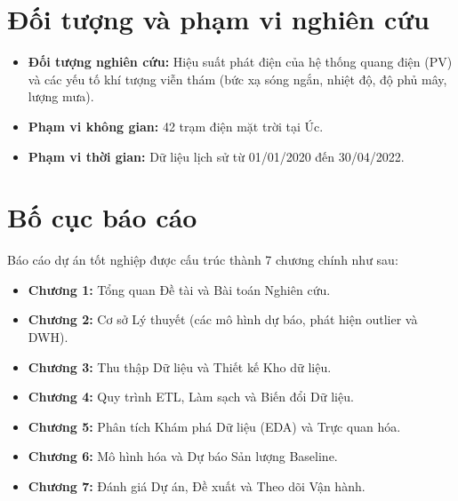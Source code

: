 \documentclass[12pt, a4paper]{report}
\begin{document}
\section{Đối tượng và phạm vi nghiên cứu}
\label{sec:phamvi}

\begin{itemize}[noitemsep]
    \item \textbf{Đối tượng nghiên cứu:} Hiệu suất phát điện của hệ thống quang điện (PV) và các yếu tố khí tượng viễn thám (bức xạ sóng ngắn, nhiệt độ, độ phủ mây, lượng mưa).
    \item \textbf{Phạm vi không gian:} 42 trạm điện mặt trời tại Úc.
    \item \textbf{Phạm vi thời gian:} Dữ liệu lịch sử từ 01/01/2020 đến 30/04/2022.
\end{itemize}

\section{Bố cục báo cáo}
\label{sec:bocuc}

Báo cáo dự án tốt nghiệp được cấu trúc thành 7 chương chính như sau:
\begin{itemize}[noitemsep]
    \item \textbf{Chương 1:} Tổng quan Đề tài và Bài toán Nghiên cứu.
    \item \textbf{Chương 2:} Cơ sở Lý thuyết (các mô hình dự báo, phát hiện outlier và DWH).
    \item \textbf{Chương 3:} Thu thập Dữ liệu và Thiết kế Kho dữ liệu.
    \item \textbf{Chương 4:} Quy trình ETL, Làm sạch và Biến đổi Dữ liệu.
    \item \textbf{Chương 5:} Phân tích Khám phá Dữ liệu (EDA) và Trực quan hóa.
    \item \textbf{Chương 6:} Mô hình hóa và Dự báo Sản lượng Baseline.
    \item \textbf{Chương 7:} Đánh giá Dự án, Đề xuất và Theo dõi Vận hành.
\end{itemize}







\end{document}
